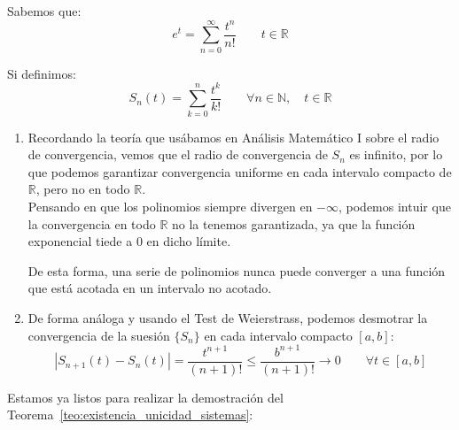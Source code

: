\begin{ejemplo}
    Sabemos que:
    \begin{equation*}
        e^t = \sum_{n=0}^{\infty} \dfrac{t^n}{n!} \qquad t\in \mathbb{R}
    \end{equation*}

    Si definimos:
    \begin{equation*}
        S_n(t) = \sum_{k=0}^{n} \dfrac{t^k}{k!} \qquad \forall n\in \mathbb{N}, \quad t\in \mathbb{R}
    \end{equation*}

    \begin{enumerate}
        \item Recordando la teoría que usábamos en Análisis Matemático I sobre el radio de convergencia, vemos que el radio de convergencia de $S_n$ es infinito, por lo que podemos garantizar convergencia uniforme en cada intervalo compacto de $\mathbb{R}$, pero no en todo $\mathbb{R}$.\\

            Pensando en que los polinomios siempre divergen en $-\infty$, podemos intuir que la convergencia en todo $\mathbb{R}$ no la tenemos garantizada, ya que la función exponencial tiede a 0 en dicho límite.

    De esta forma, una serie de polinomios nunca puede converger a una función que está acotada en un intervalo no acotado.
\item De forma análoga y usando el Test de Weierstrass, podemos desmotrar la convergencia de la suesión $\{S_n\}$ en cada intervalo compacto $[a,b]$:
            \begin{equation*}
                |S_{n+1}(t) - S_n(t)| = \dfrac{t^{n+1}}{(n+1)!} \leq \dfrac{b^{n+1}}{(n+1)!} \longrightarrow 0 \qquad \forall t\in [a,b]
            \end{equation*}
    \end{enumerate}
\end{ejemplo}

\noindent
Estamos ya listos para realizar la demostración del Teorema~\ref{teo:existencia_unicidad_sistemas}:


